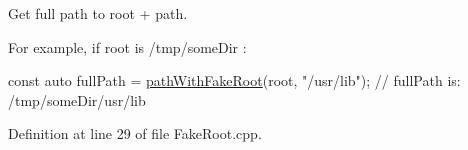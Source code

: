 Get full path to root + path. 

For example, if root is /tmp/some\+Dir \+: 
\begin{DoxyCode}
\textcolor{keyword}{const} \textcolor{keyword}{auto} fullPath = \hyperlink{namespace_mdt_1_1_test_lib_a5d165ffbf0595a09fd01a820d684f44b}{pathWithFakeRoot}(root, \textcolor{stringliteral}{"/usr/lib"});
\textcolor{comment}{// fullPath is: /tmp/someDir/usr/lib}
\end{DoxyCode}
 

Definition at line 29 of file Fake\+Root.\+cpp.

